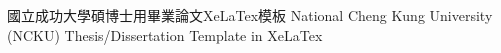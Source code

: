 
%




\DemoMode


%
%
%
%
%

\SetTitle
{國立成功大學碩博士用畢業論文XeLaTex模板}
{National Cheng Kung University (NCKU) Thesis/Dissertation Template in XeLaTex}



%

\PhdDegree





